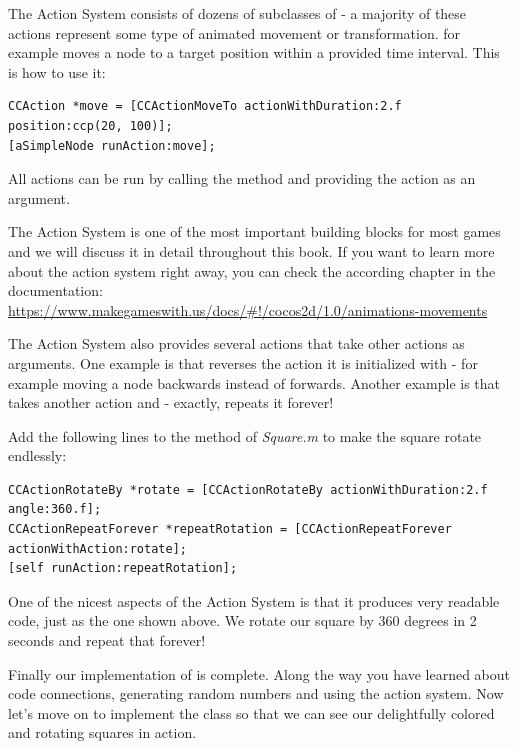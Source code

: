 The Action System consists of
dozens of subclasses of \inlinecode{\ccaction{}} - a majority of these actions represent some type of animated movement or
transformation.  for example moves a node to a
target position within a provided time interval. This is how to use it:
\begin{lstlisting}
CCAction *move = [CCActionMoveTo actionWithDuration:2.f position:ccp(20, 100)];
[aSimpleNode runAction:move];
\end{lstlisting}
All actions can be run by calling the  method and
providing the action as an argument. 

\begin{details}[frametitle={More about the
\cocos{} Action System}] The \cocos{} Action System is one of the most
important building blocks for most games and we will discuss it in detail
throughout this book. If you want to learn more about the \cocos{} action system
right away, you can check the according chapter in the \cocos{} documentation:
\url{https://www.makegameswith.us/docs/#!/cocos2d/1.0/animations-movements}
\end{details}

The Action System also provides several actions that take other actions as
arguments. One example is  that reverses the action
it is initialized with - for example moving a node backwards instead of
forwards. Another example is  that takes
another action and - exactly, repeats it forever!

Add the following lines to the  method of \textit{Square.m}
to make the square rotate endlessly:
\begin{lstlisting}
CCActionRotateBy *rotate = [CCActionRotateBy actionWithDuration:2.f angle:360.f];
CCActionRepeatForever *repeatRotation = [CCActionRepeatForever actionWithAction:rotate];
[self runAction:repeatRotation];
\end{lstlisting}
One of the nicest aspects of the Action System is that it produces very readable
code, just as the one shown above. We rotate our square by 360 degrees in 2
seconds and repeat that forever!

Finally our implementation of  is complete. Along the way you
have learned about code connections, generating random numbers and using the
action system. Now let's move on to implement the  class so
that we can see our delightfully colored and rotating squares in action.

